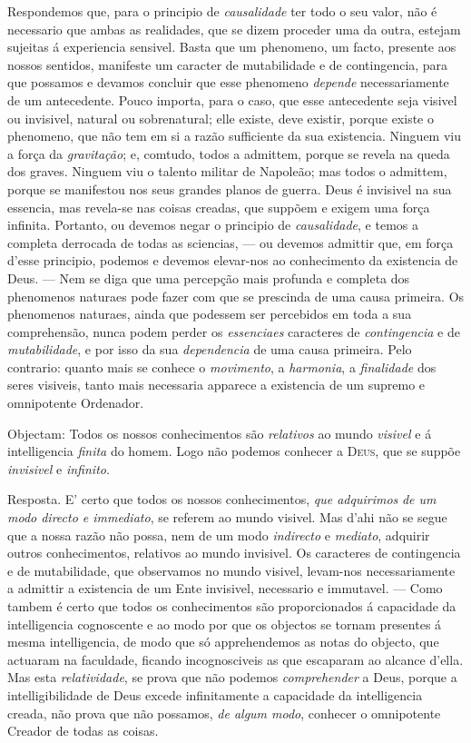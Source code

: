 {Respondemos que, para o principio de \emph{causalidade} ter todo o seu valor, não é
necessario que ambas as realidades, que se dizem proceder uma da outra, estejam
sujeitas á experiencia sensivel. Basta que um phenomeno, um facto, presente aos nossos
sentidos, manifeste um caracter de mutabilidade e de contingencia, para que possamos e
devamos concluir que esse phenomeno \emph{depende} necessariamente de um antecedente.
Pouco importa, para o caso, que esse antecedente seja visivel ou invisivel, natural ou
sobrenatural; elle existe, deve existir, porque existe o phenomeno, que não tem em si a
razão sufficiente da sua existencia. Ninguem viu a força da \emph{gravitação}; e,
comtudo, todos a admittem, porque se revela na queda dos graves. Ninguem viu o talento
militar de Napoleão; mas todos o admittem, porque se manifestou nos seus grandes planos
de guerra. Deus é invisivel na sua essencia, mas revela-se nas coisas creadas, que
suppõem e exigem uma força infinita. Portanto, ou devemos negar o principio de
\emph{causalidade}, e temos a completa derrocada de todas as sciencias, --- ou devemos
admittir que, em força d'esse principio, podemos e devemos elevar-nos ao conhecimento
da existencia de Deus. --- Nem se diga que uma percepção mais profunda e completa dos
phenomenos naturaes pode fazer com que se prescinda de uma causa primeira. Os
phenomenos naturaes, ainda que podessem ser percebidos em toda a sua comprehensão,
nunca podem perder os \emph{essenciaes} caracteres de \emph{contingencia} e de
\emph{mutabilidade}, e por isso da sua \emph{dependencia} de uma causa primeira. Pelo
contrario: quanto mais se conhece o \emph{movimento}, a \emph{harmonia}, a
\emph{finalidade} dos seres visiveis, tanto mais necessaria apparece a existencia de um
supremo e omnipotente Ordenador.

Objectam: Todos os nossos conhecimentos são \emph{relativos} ao mundo \emph{visivel} e
á intelligencia \emph{finita} do homem. Logo não podemos conhecer a \textsc{Deus}, que
se suppõe \emph{invisivel} e \emph{infinito}.

Resposta. E' certo que todos os nossos conhecimentos, \emph{que adquirimos}
\emph{de um modo directo e immediato}, se referem ao mundo visivel. Mas d'ahi não se
segue que a nossa razão não possa, nem de um modo \emph{indirecto} e \emph{mediato},
adquirir outros conhecimentos, relativos ao mundo invisivel. Os caracteres de
contingencia e de mutabilidade, que observamos no mundo visivel, levam-nos
necessariamente a admittir a existencia de um Ente invisivel, necessario e immutavel.
--- Como tambem é certo que todos os conhecimentos são proporcionados á capacidade da
intelligencia cognoscente e ao modo por que os objectos se tornam presentes á mesma
intelligencia, de modo que só apprehendemos as notas do objecto, que actuaram na
faculdade, ficando incognosciveis as que escaparam ao alcance d'ella. Mas esta
\emph{relatividade}, se prova que não podemos \emph{comprehender} a Deus, porque a
intelligibilidade de Deus excede infinitamente a capacidade da intelligencia creada,
não prova que não possamos, \emph{de algum modo}, conhecer o omnipotente Creador de
todas as coisas.

}
